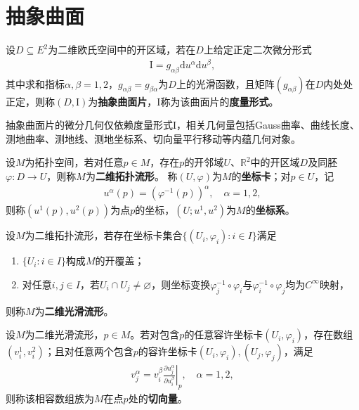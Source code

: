 \documentclass[../../main.tex]{subfiles}%
\begin{document}
\section{抽象曲面}

\begin{definition}
设$D\subseteq E^2$为二维欧氏空间中的开区域，若在$D$上给定正定二次微分形式
\begin{align}
\mathrm{I}=g_{\alpha\beta}\mathrm{d}u^\alpha\mathrm{d}u^\beta,\label{eq:6.0}
\end{align}
其中求和指标$\alpha,\beta=1,2$，$g_{\alpha\beta}=g_{\beta\alpha}$为$D$上的光滑函数，且矩阵$(g_{\alpha\beta})$在$D$内处处正定，则称$(D,\mathrm{I})$为\textbf{抽象曲面片}，$\mathrm{I}$称为该曲面片的\textbf{度量形式}。
\end{definition}

\begin{remark}
抽象曲面片的微分几何仅依赖度量形式$\mathrm{I}$，相关几何量包括Gauss曲率、曲线长度、测地曲率、测地线、测地坐标系、切向量平行移动等内蕴几何对象。
\end{remark}

\begin{definition}
设$M$为拓扑空间，若对任意$p\in M$，存在$p$的开邻域$U$、$\mathbb{R}^2$中的开区域$D$及同胚$\varphi:D\to U$，则称$M$为\textbf{二维拓扑流形}。
称$(U,\varphi)$为$M$的\textbf{坐标卡}；对$p\in U$，记
\begin{align}
u^\alpha(p)=(\varphi^{-1}(p))^\alpha,\quad \alpha=1,2,\label{eq:6.1}
\end{align}
则称$(u^1(p),u^2(p))$为点$p$的坐标，$(U;u^1,u^2)$为$M$的\textbf{坐标系}。
\end{definition}

\begin{definition}
设$M$为二维拓扑流形，若存在坐标卡集合$\{(U_i,\varphi_i):i\in I\}$满足
\begin{enumerate}[(1)]
\item $\{U_i:i\in I\}$构成$M$的开覆盖；
\item 对任意$i,j\in I$，若$U_i\cap U_j\neq\varnothing $，则坐标变换$\varphi_j^{-1}\circ\varphi_i$与$\varphi_i^{-1}\circ\varphi_j$均为$C^\infty$映射，
\end{enumerate}
则称$M$为\textbf{二维光滑流形}。
\end{definition}

\begin{definition}
设$M$为二维光滑流形，$p\in M$。若对包含$p$的任意容许坐标卡$(U_i,\varphi_i)$，存在数组$(v_i^1,v_i^2)$；且对任意两个包含$p$的容许坐标卡$(U_i,\varphi_i),(U_j,\varphi_j)$，满足
\begin{align}
v_j^\alpha=v_i^\beta\left.\frac{\partial u_j^\alpha}{\partial u_i^\beta}\right|_p,\quad \alpha=1,2,\label{eq:6.2}
\end{align}
则称该相容数组族为$M$在点$p$处的\textbf{切向量}。
\end{definition}
\end{document}
